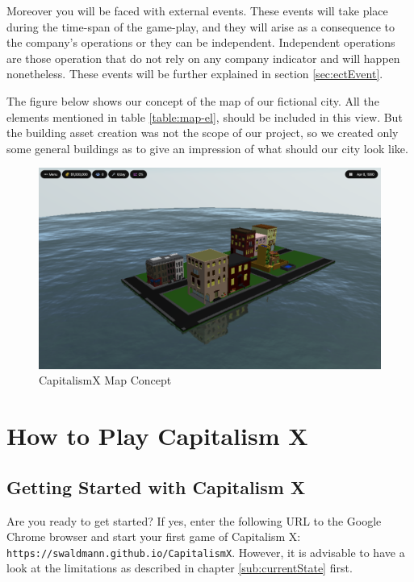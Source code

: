 \documentclass[11pt,titlepage,oneside,openany]{book}
\begin{document}
Moreover you will be faced with external events. These events will take place during the time-span of the game-play, and they will arise as a consequence to the company’s operations or they can be independent. Independent operations are those operation that do not rely on any company indicator and will happen nonetheless. These events will be further explained in section \ref{sec:ectEvent}.	

The figure below shows our concept of the map of our fictional city. All the elements mentioned in table \ref{table:map-el}, should be included in this view. But the building asset creation was not the scope of our project, so we created only some general buildings as to give an impression
of what should our city look like. 
\begin{figure} [!ht]
    \centering
    \includegraphics[scale=0.23]{images/screenshot-map.png}
    \caption{CapitalismX Map Concept}
    \label{fig:map}
\end{figure}



\chapter{How to Play Capitalism X}
\label{cha:howtoplay}

\section{Getting Started with Capitalism X}

Are you ready to get started? If yes, enter the following URL to the Google Chrome browser and start your first game of Capitalism X: \\
\texttt{https://swaldmann.github.io/CapitalismX}.
However, it is advisable to have a look at the limitations as described in chapter \ref{sub:currentState} first.
\end{document}
